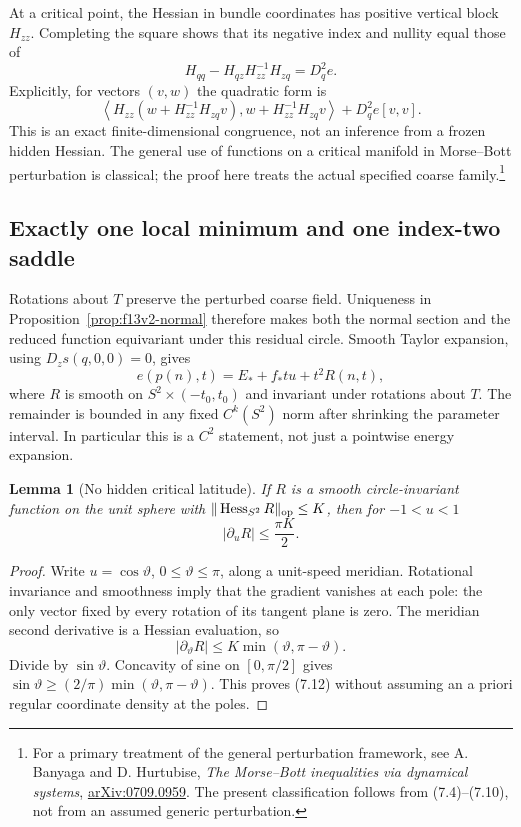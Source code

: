 \documentclass[11pt,oneside]{article}
\newtheorem{lemma}[theorem]{Lemma}
\DeclareMathOperator{\Hess}{Hess}
\begin{document}
At a critical point, the Hessian in
bundle coordinates has positive
vertical block \(H_{zz}\). Completing
the square shows that its negative
index and nullity equal those of
\[
 H_{qq}-H_{qz}H_{zz}^{-1}H_{zq}
                          =D_q^2e.
 \tag{7.9}
\]
Explicitly, for vectors \((v,w)\)
the quadratic form is
\[
 \left\langle H_{zz}
       (w+H_{zz}^{-1}H_{zq}v),
       w+H_{zz}^{-1}H_{zq}v\right\rangle
       +D_q^2e[v,v].
 \tag{7.10}
\]
This is an exact finite-dimensional
congruence, not an inference from a
frozen hidden Hessian. The general
use of functions on a critical
manifold in Morse--Bott perturbation
is classical; the proof here treats
the actual specified coarse family.\footnote{
For a primary treatment of the
general perturbation framework, see
A. Banyaga and D. Hurtubise,
\emph{The Morse--Bott inequalities via dynamical systems},
\href{https://arxiv.org/abs/0709.0959}{arXiv:0709.0959}.
The present classification follows
from (7.4)--(7.10), not from an
assumed generic perturbation.}

\subsection{Exactly one local minimum and one index-two saddle}

Rotations about \(T\) preserve the
perturbed coarse field. Uniqueness
in Proposition~\ref{prop:f13v2-normal}
therefore makes both the normal
section and the reduced function
equivariant under this residual
circle. Smooth Taylor expansion,
using \(D_zs(q,0,0)=0\), gives
\[
 e(p(n),t)=E_*+f_*tu+t^2R(n,t),
 \tag{7.11}
\]
where \(R\) is smooth on
\(S^2\times(-t_0,t_0)\) and invariant
under rotations about \(T\).
The remainder is bounded in any
fixed \(C^k(S^2)\) norm after shrinking
the parameter interval. In particular
this is a \(C^2\) statement, not just
a pointwise energy expansion.

\begin{lemma}[No hidden critical latitude]
\label{lem:f13v2-latitude}
If \(R\) is a smooth circle-invariant
function on the unit sphere with
\(\|\Hess_{S^2}R\|_{\rm op}\le K\),
then for \(-1<u<1\)
\[
                           |\partial_u R|\le\frac{\pi K}{2}.
 \tag{7.12}
\]
\end{lemma}
\begin{proof}
Write \(u=\cos\vartheta\),
\(0\le\vartheta\le\pi\), along
a unit-speed meridian. Rotational
invariance and smoothness imply that
the gradient vanishes at each pole:
the only vector fixed by every
rotation of its tangent plane is zero.
The meridian second derivative is
a Hessian evaluation, so
\[
 |\partial_\vartheta R|
                  \le K\min(\vartheta,\pi-\vartheta).
\]
Divide by \(\sin\vartheta\).
Concavity of sine on \([0,\pi/2]\)
gives
\(\sin\vartheta\ge
 (2/\pi)\min(\vartheta,\pi-\vartheta)\).
This proves (7.12) without assuming
an a priori regular coordinate
density at the poles.
\end{proof}
\end{document}
